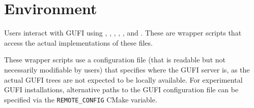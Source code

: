 \section{Environment}

Users interact with GUFI using \gufidu, \gufigetfattr, \gufifind,
\gufils, \gufistat, and \gufistats. These are wrapper scripts that
access the actual implementations of these files.

These wrapper scripts use a configuration file (that is readable but
not necessarily modifiable by users) that specifies where the GUFI
server is, as the actual GUFI trees are not expected to be locally
available. For experimental GUFI installations, alternative paths to
the GUFI configuration file can be specified via the
\texttt{REMOTE\_CONFIG} CMake variable.
